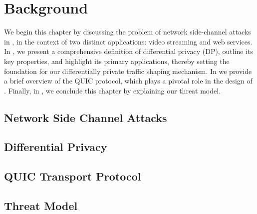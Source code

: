 \chapter{Background}\label{ch:background}





We begin this chapter by discussing the problem of network side-channel attacks in , in the context of two distinct applications: video streaming and web services.
In , we present a comprehensive definition of differential privacy (DP), outline its key properties, and highlight its primary applications, thereby setting the foundation for our differentially private traffic shaping mechanism.
In  we provide a brief overview of the QUIC protocol, which plays a pivotal role in the design of {\sys}.
Finally, in , we conclude this chapter by explaining our threat model. 

\section{Network Side Channel Attacks}\label{sec:ns-attacks}



\section{Differential Privacy}\label{sec:dp-background}


\section{QUIC Transport Protocol}\label{sec:background-quic}



\section{Threat Model}\label{sec:threat-model}





